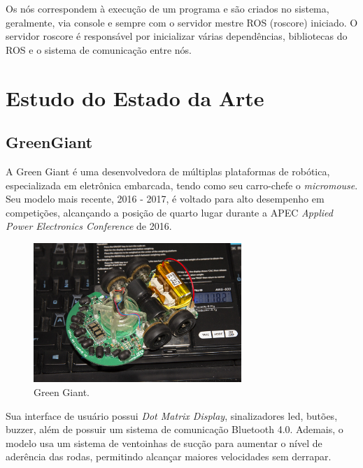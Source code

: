 Os nós correspondem à execução de um programa e são criados no sistema, geralmente, via console e sempre com o servidor mestre ROS (roscore) iniciado. O servidor roscore é responsável por inicializar várias dependências, bibliotecas do ROS e o sistema de comunicação entre nós.

\section{Estudo do Estado da Arte}
\label{sec:sota}

\subsection{GreenGiant}
\hspace{0.5cm} A Green Giant é uma desenvolvedora de múltiplas plataformas de robótica, especializada em eletrônica embarcada, tendo como seu carro-chefe o \textit{micromouse}. Seu modelo mais recente, 2016 - 2017, é voltado para alto desempenho em competições, alcançando a posição de quarto lugar durante a APEC \textit{Applied Power Electronics Conference} de 2016.

\begin{figure}[H]
	\centering
	\includegraphics[width=0.7\textwidth]
	{Figures/GreenGiant_model.jpg}
	\caption{\label{fig:Green_Giant_model} Green Giant. }
	\end{figure}

\hspace{0.5cm}Sua interface de usuário possui \textit{Dot Matrix Display}, sinalizadores led, butões, buzzer, além de possuir um sistema de comunicação Bluetooth 4.0. Ademais, o modelo usa um sistema de ventoinhas de sucção para aumentar o nível de aderência das rodas, permitindo alcançar maiores velocidades sem derrapar.


